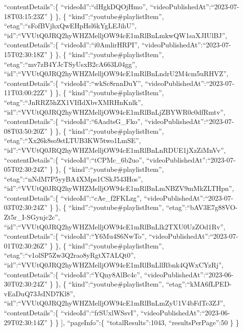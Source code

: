 \documentclass[11pt]{article}
\begin{document}
``contentDetails'':\{ ``videoId'':``dHgkDQOjHmo'',
``videoPublishedAt'':``2023-07-18T03:15:23Z'' \} \}, \{
``kind'':``youtube\#playlistItem'',
``etag'':``sFofBVjhxQwEHpHsl6kYgLEJihU'',
``id'':``VVUtQ0JRQ2hyWHZMelljOW94cE1mRlBnLmkwQW1saXJIUlBJ'',
``contentDetails'':\{ ``videoId'':``i0AmlirHRPI'',
``videoPublishedAt'':``2023-07-15T02:30:18Z'' \} \}, \{
``kind'':``youtube\#playlistItem'',
``etag'':``mv7zB4YJcTSyUsxB2cA663L04gg'',
``id'':``VVUtQ0JRQ2hyWHZMelljOW94cE1mRlBnLndrU2M4cm5uRHVZ'',
``contentDetails'':\{ ``videoId'':``wkSc8rnnDuY'',
``videoPublishedAt'':``2023-07-11T03:00:22Z'' \} \}, \{
``kind'':``youtube\#playlistItem'',
``etag'':``JnRRZ5hZX1VIfIdXbvXMRHnKnlk'',
``id'':``VVUtQ0JRQ2hyWHZMelljOW94cE1mRlBnLjZBYWR0c0dfRmtv'',
``contentDetails'':\{ ``videoId'':``6AadtsG\_Fko'',
``videoPublishedAt'':``2023-07-08T03:50:20Z'' \} \}, \{
``kind'':``youtube\#playlistItem'',
``etag'':``Xx26k8so9stLTUB3KW5two1LmSE'',
``id'':``VVUtQ0JRQ2hyWHZMelljOW94cE1mRlBnLnRDUE1jXzZiMnVv'',
``contentDetails'':\{ ``videoId'':``tCPMc\_6b2uo'',
``videoPublishedAt'':``2023-07-05T02:30:24Z'' \} \}, \{
``kind'':``youtube\#playlistItem'',
``etag'':``nNdM7P5yyBA4XMps1CSkJ543Hos'',
``id'':``VVUtQ0JRQ2hyWHZMelljOW94cE1mRlBnLmNBZV9mMkZLTHpn'',
``contentDetails'':\{ ``videoId'':``cAe\_f2FKLzg'',
``videoPublishedAt'':``2023-07-03T02:30:24Z'' \} \}, \{
``kind'':``youtube\#playlistItem'',
``etag'':``bAV3E7g88VO-Zt5r\_I-SGynjc2c'',
``id'':``VVUtQ0JRQ2hyWHZMelljOW94cE1mRlBnLlk2TXU0UzZOd1Rv'',
``contentDetails'':\{ ``videoId'':``Y6Mu4S6NwTo'',
``videoPublishedAt'':``2023-07-01T02:30:26Z'' \} \}, \{
``kind'':``youtube\#playlistItem'',
``etag'':``v1olSP5Zw3Q2rao8yRgtX7ALQt0'',
``id'':``VVUtQ0JRQ2hyWHZMelljOW94cE1mRlBnLllRbnk4QWxCYzRj'',
``contentDetails'':\{ ``videoId'':``YQny8AlBc4c'',
``videoPublishedAt'':``2023-06-30T02:30:24Z'' \} \}, \{
``kind'':``youtube\#playlistItem'',
``etag'':``kMA6fLPED-vEaDuQ73JsIND7Kl8'',
``id'':``VVUtQ0JRQ2hyWHZMelljOW94cE1mRlBnLmZyU1V4bFdTc3ZJ'',
``contentDetails'':\{ ``videoId'':``frSUxlWSsvI'',
``videoPublishedAt'':``2023-06-29T02:30:14Z'' \} \} {]}, ``pageInfo'':\{
``totalResults'':1043, ``resultsPerPage'':50 \} \}
\end{document}
